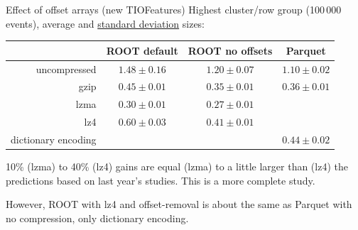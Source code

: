 \documentclass[aspectratio=169]{beamer}
\begin{document}
\begin{frame}{Effect of offset arrays (new TIOFeatures)}
\vspace{0.35 cm}
Highest cluster/row group (100\,000 events), average and \underline{standard deviation} sizes:

\renewcommand{\arraystretch}{1.2}

\begin{center}
\begin{tabular}{r c c c}
                    & ROOT default    & ROOT no offsets & Parquet         \\\hline
uncompressed        & $1.48 \pm 0.16$ & $1.20 \pm 0.07$ & $1.10 \pm 0.02$ \\
gzip                & $0.45 \pm 0.01$ & $0.35 \pm 0.01$ & $0.36 \pm 0.01$ \\
lzma                & $0.30 \pm 0.01$ & $0.27 \pm 0.01$ &                 \\
lz4                 & $0.60 \pm 0.03$ & $0.41 \pm 0.01$ &                 \\
dictionary encoding &                 &                 & $0.44 \pm 0.02$ \\
\end{tabular}
\end{center}

\vspace{0.25 cm}
10\% (lzma) to 40\% (lz4) gains are equal (lzma) to a little larger than (lz4) the predictions based on last year's studies. This is a more complete study.

\vspace{0.25 cm}
However, ROOT with lz4 and offset-removal is about the same as Parquet with no compression, only dictionary encoding.
\end{frame}
\end{document}
